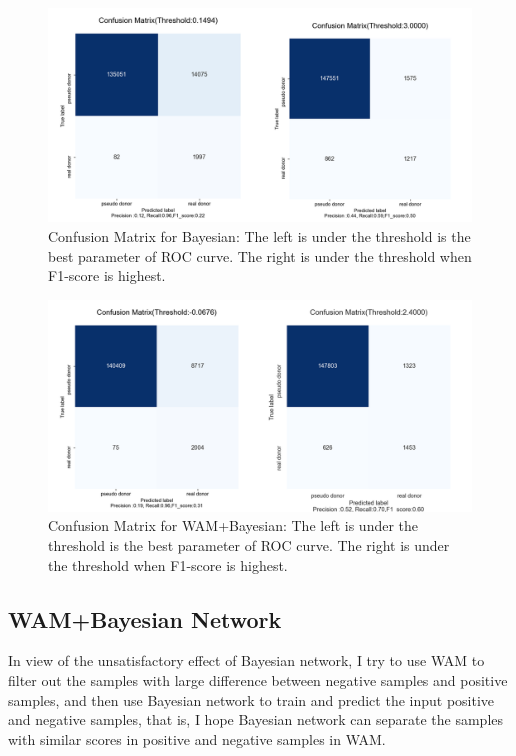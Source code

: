 \documentclass{gapd}
\begin{document}
\begin{figure}
  \centering
  \includegraphics[width=0.8\linewidth]{assets/image-20210624154725944.png}
  \caption{Confusion Matrix for Bayesian: The left is under the threshold is
  the best parameter of ROC curve. The right is under the threshold when
  F1-score is highest.}
  \label{fig:BNmatrix}
\end{figure}
  
\begin{figure}
\centering
\includegraphics[width=0.8\linewidth]{assets/image-20210624154819817.png}
\caption{Confusion Matrix for WAM+Bayesian: The left is under the
threshold is the best parameter of ROC curve. The right is under the
threshold when F1-score is highest.}
\label{fig:WBmatrix}
\end{figure}


\subsection{WAM+Bayesian Network}\label{wambayesian-network}

In view of the unsatisfactory effect of Bayesian network, I try to use
WAM to filter out the samples with large difference between negative
samples and positive samples, and then use Bayesian network to train and
predict the input positive and negative samples, that is, I hope
Bayesian network can separate the samples with similar scores in
positive and negative samples in WAM.
\end{document}
